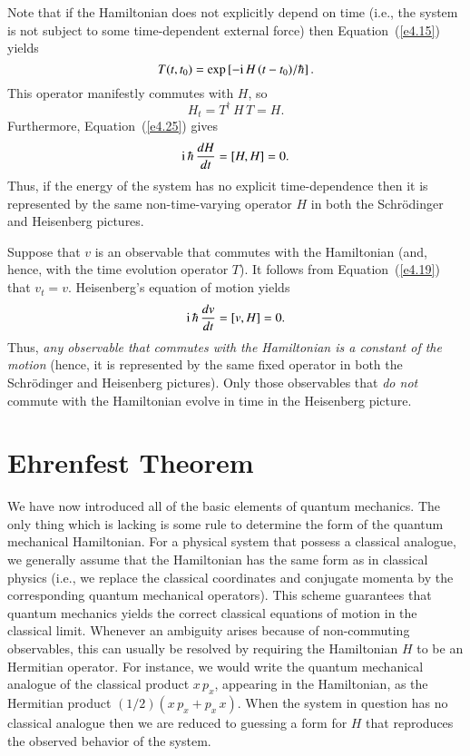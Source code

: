 Note that if the Hamiltonian does not explicitly depend on time ({\rm i.e.}, the system is
not subject to some time-dependent external force) then Equation~(\ref{e4.15}) yields
\begin{equation}\label{e4.28}
T(t, t_0) = \exp\left[-{\rm i}\, H\,(t-t_0)/\hbar \right].
\end{equation}
This operator manifestly commutes with $H$, so 
\begin{equation}
H_t = T^{\dag}\, H \,T = H.
\end{equation}
Furthermore, Equation~(\ref{e4.25}) gives
\begin{equation}
{\rm i}\,\hbar \,\frac{dH}{dt} = [H, H] = 0.
\end{equation}
Thus, if the energy of the system  has no explicit time-dependence then it is 
represented by the same non-time-varying operator $H$ in both the Schr\"{o}dinger
and Heisenberg pictures. 

Suppose that $v$ is an observable that commutes with the Hamiltonian
(and, hence, with the time evolution operator $T$). It follows from Equation~(\ref{e4.19})
that $v_t= v$. Heisenberg's equation of motion yields
\begin{equation}
{\rm i}\,\hbar \,\frac{d v}{dt} = [v, H] = 0.
\end{equation}
Thus, {\em any observable that commutes with the Hamiltonian is a constant
of the motion} (hence, it is represented by the same fixed operator in
both the Schr\"{o}dinger and Heisenberg pictures). Only those observables
that {\em do not}\/ commute with the Hamiltonian evolve 
in time in the Heisenberg picture.

\section{Ehrenfest  Theorem}
We have now introduced all of the basic elements of quantum mechanics. The only
thing which is lacking is some rule  to determine the form of the 
quantum mechanical Hamiltonian. For a physical system that possess a classical
analogue, we generally assume that the Hamiltonian has the same form as
in classical physics ({\rm i.e.}, we replace the classical coordinates and conjugate
momenta by the corresponding quantum mechanical operators). This scheme guarantees
that quantum mechanics yields the correct classical equations of motion
in the classical limit. Whenever an ambiguity arises because of 
non-commuting
observables, this can usually be resolved by requiring the Hamiltonian $H$ to
be an Hermitian operator. For instance, we would write the
quantum mechanical analogue of the classical product $x\,p_x$, appearing in the
Hamiltonian, as the Hermitian product $(1/2)(x\,p_x + p_x\,x)$. When the system
in question has no classical analogue then we are reduced to guessing a form
for $H$ that reproduces the observed behavior of the system. 

